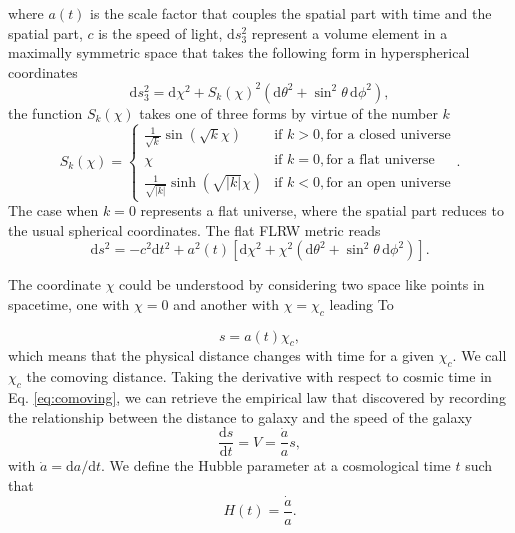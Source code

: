 where $a(t)$ is the scale factor that couples the spatial part with time and the spatial part, $c$ is the speed of light, $\mathrm{d}s_3^2$ represent a volume element in a maximally symmetric space that takes the following form in hyperspherical coordinates
\begin{equation}\label{eq:sphere3}
    \mathrm{d}s_3^2 = \mathrm{d}\chi^2 + S_k(\chi)^2 \left( \mathrm{d}\theta^2 + \sin^2 \theta \, \mathrm{d}\phi^2 \right),
\end{equation}
the function $S_k(\chi)$ takes one of three forms by virtue of the number $k$
\begin{equation}
S_k(\chi) = 
\begin{cases} 
    \frac{1}{\sqrt{k}} \sin(\sqrt{k} \chi) & \text{if } k > 0, \text{for a closed universe}\\
    \chi & \text{if } k = 0, \text{for a flat universe}\\
    \frac{1}{\sqrt{|k|}} \sinh(\sqrt{|k|} \chi) & \text{if } k < 0, \text{for an open universe}
\end{cases}.
\end{equation}
The case when $k = 0$ represents a flat universe, where the spatial part reduces to the usual spherical coordinates. The flat FLRW metric reads
\begin{equation} \label{eq:FLRW}
    \mathrm{d}s^2 = -c^2\mathrm{d}t^2 + a^2(t) \left[ \mathrm{d}\chi^2 + \chi^2 \left( \mathrm{d}\theta^2 + \sin^2 \theta \, \mathrm{d}\phi^2 \right)\right].
\end{equation}

The coordinate $\chi$ could be understood by considering two space like points in spacetime, one with $\chi = 0$ and another with $\chi = \chi_c$ leading To

\begin{equation}\label{eq:comoving}
    s = a(t) \chi_c, 
\end{equation}
which means that the physical distance changes with time for a given $\chi_c$. We call $\chi_c$ the comoving distance. Taking the derivative with respect to cosmic time in Eq. \ref{eq:comoving}, we can retrieve the empirical law that \citet{Hubble_1929} discovered by recording the relationship between the distance to galaxy and the speed of the galaxy
\begin{equation}
   \frac{\mathrm{d}s}{\mathrm{d}t} = V = \frac{\dot{a}}{a} s,
\end{equation}
with $\dot{a} = \mathrm{d}a/\mathrm{d}t$. We define the Hubble parameter at a cosmological time $t$ such that
\begin{equation} \label{eq:hubble}
    H(t) = \frac{\dot{a}}{a}.
\end{equation}

